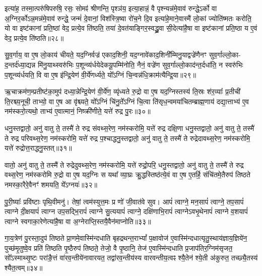 इत्या॑ह॒ तस्मा॒त्परु॑षिपरुषि॒ रसः॒ सोमꣴ॑ श्रीणन्ति॒ पृश्ञ॑य॒ इत्या॒हान्नं॒ वै पृश्न्यन्न॑मे॒वाव॑ रुन्द्धे॒\-ऽर्को वा अ॒ग्निर॒र्को\-ऽन्न॒मन्न॑मे॒वाव॑ रुन्द्धे॒ जन्मं॑ दे॒वानां॒ विश॑स्त्रि॒ष्वा रो॑च॒ने दि॒व इत्या॑हे॒माने॒वास्मै॑ लो॒कां ज्योति॑ष्मतः करोति॒ यो वा इष्ट॑कानां प्रति॒ष्ठां वेद॒ प्रत्ये॒व ति॑ष्ठति॒ तया॑ दे॒वत॑याङ्गिर॒स्वद्ध्रु॒वा सी॒देत्या॑है॒षा वा इष्ट॑कानां प्रति॒ष्ठा य ए॒वं वेद॒ प्रत्ये॒व ति॑ष्ठति॥२८॥

{\anuvakamend[{रू॒पाणि॒ सूद॑दोहस॒स्तया॒ षोड॑श च॥६॥}]}

सु॒व॒र्गाय॒ वा ए॒ष लो॒काय॑ चीयते॒ यद॒ग्निर्वज्र॑ एकाद॒शिनी॒ यद॒ग्नावे॑काद॒शिनी᳚म्मिनु॒याद्वज्रे॑णैनꣳ सुव॒र्गाल्लो॒का- द॒न्तर्द॑ध्या॒द्यन्न मि॑नु॒याथ्स्वरु॑भिः प॒शून्व्य॑र्धयेदेकयू॒पम्मि॑नोति॒ नैनं॒ वज्रे॑ण सुव॒र्गाल्लो॒काद॑न्त॒र्दधा॑ति॒ न स्वरु॑भिः प॒शून्व्य॑र्धयति॒ वि वा ए॒ष इ॑न्द्रि॒येण॑ वी॒र्ये॑णर्ध्यते॒ यो᳚\-ऽग्निं चि॒न्वन्न॑धि॒क्राम॑त्यैन्द्रि॒या॥२९॥

ऋ॒चाक्रम॑ण॒म्प्रतीष्ट॑का॒मुप॑ दध्या॒न्नेन्द्रि॒येण॑ वी॒र्ये॑ण॒ व्यृ॑ध्यते रु॒द्रो वा ए॒ष यद॒ग्निस्तस्य॑ ति॒स्रः श॑र॒व्याः᳚ प्र॒तीची॑ ति॒रश्च्य॒नूची॒ ताभ्यो॒ वा ए॒ष आ वृ॑श्च्यते॒ यो᳚\-ऽग्निं चि॑नु॒ते᳚\-ऽग्निं चि॒त्वा ति॑सृध॒न्वमया॑चितम्ब्राह्म॒णाय॑ दद्या॒त्ताभ्य॑ ए॒व नम॑स्करो॒त्यथो॒ ताभ्य॑ ए॒वात्मानं॒ निष्क्री॑णीते॒ यत्ते॑ रुद्र पु॒रः॥३०॥

धनु॒स्तद्वातो॒ अनु॑ वातु ते॒ तस्मै॑ ते रुद्र संवथ्स॒रेण॒ नम॑स्करोमि॒ यत्ते॑ रुद्र दक्षि॒णा धनु॒स्तद्वातो॒ अनु॑ वातु ते॒ तस्मै॑ ते रुद्र परिवथ्स॒रेण॒ नम॑स्करोमि॒ यत्ते॑ रुद्र प॒श्चाद्धनु॒स्तद्वातो॒ अनु॑ वातु ते॒ तस्मै॑ ते रुद्रेदावथ्स॒रेण॒ नम॑स्करोमि॒ यत्ते॑ रुद्रोत्त॒राद्धनु॒स्तत्॥३१॥

वातो॒ अनु॑ वातु ते॒ तस्मै॑ ते रुद्रेदुवथ्स॒रेण॒ नम॑स्करोमि॒ यत्ते॑ रुद्रो॒परि॒ धनु॒स्तद्वातो॒ अनु॑ वातु ते॒ तस्मै॑ ते रुद्र वथ्स॒रेण॒ नम॑स्करोमि रु॒द्रो वा ए॒ष यद॒ग्निः स यथा᳚ व्या॒घ्रः क्रु॒द्धस्तिष्ठ॑त्ये॒वं वा ए॒ष ए॒तर्\mbox{}हि॒ संचि॑तमे॒तैरुप॑ तिष्ठते नमस्का॒रैरे॒वैनꣳ॑ शमयति॒ ये᳚\-ऽग्नयः॑॥३२॥

पु॒री॒ष्याः᳚ प्रवि॑ष्टाः पृथि॒वीमनु॑। तेषां॒ त्वम॑स्युत्त॒मः प्र णो॑ जी॒वात॑वे सुव। आपं॑ त्वाग्ने॒ मन॒सापं॑ त्वाग्ने॒ तप॒सापं॑ त्वाग्ने दी॒क्षयापं॑ त्वाग्न उप॒सद्भि॒रापं॑ त्वाग्ने सु॒त्ययापं॑ त्वाग्ने॒ दक्षि॑णाभि॒रापं॑ त्वाग्ने\-ऽवभृ॒थेनापं॑ त्वाग्ने व॒शयापं॑ त्वाग्ने स्वगाका॒रेणेत्या॑है॒षा वा अ॒ग्नेराप्ति॒स्तयै॒वैन॑माप्नोति॥३३॥

{\anuvakamend[{ऐ॒न्द्रि॒या पु॒र उ॑त्त॒राद्धनु॒स्तद॒ग्नय॑ आहा॒ष्टौ च॑॥७॥}]}

गा॒य॒त्रेण॑ पु॒रस्ता॒दुप॑ तिष्ठते प्रा॒णमे॒वास्मि॑न्दधाति बृहद्रथन्त॒रा\-भ्यां᳚ प॒क्षावोज॑ ए॒वास्मि॑न्दधात्यृतु॒स्थाय॑ज्ञाय॒ज्ञिये॑न॒ पुच्छ॑मृ॒तुष्वे॒व प्रति॑ तिष्ठति पृ॒ष्ठैरुप॑ तिष्ठते॒ तेजो॒ वै पृ॒ष्ठानि॒ तेज॑ ए॒वास्मि॑न्दधाति प्र॒जाप॑तिर॒ग्निम॑सृजत॒ सो᳚\-ऽस्माथ्सृ॒ष्टः परा॑ङै॒त्तं वा॑रव॒न्तीये॑नावारयत॒ तद्वा॑रव॒न्तीय॑स्य वारवन्तीय॒त्वꣴ श्यै॒तेन॑ श्ये॒ती अ॑कुरुत॒ तच्छ्यै॒तस्य॑ श्यैत॒त्वम्॥३४॥

